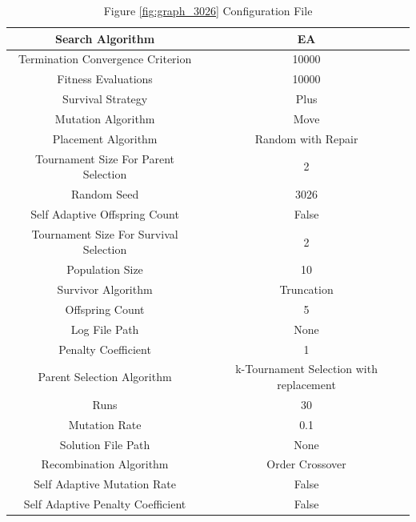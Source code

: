 \documentclass{standalone}
\begin{document}
\begin{table}[!htb]
	\centering
	\caption{Figure \ref{fig:graph_3026} Configuration File}
	\label{tab:graph_3026}
	\begin{tabular}{| c | c |}
		\hline
		Search Algorithm		& EA		 \\
		\hline
		Termination Convergence Criterion		& 10000		 \\
		\hline
		Fitness Evaluations		& 10000		 \\
		\hline
		Survival Strategy		& Plus		 \\
		\hline
		Mutation Algorithm		& Move		 \\
		\hline
		Placement Algorithm		& Random with Repair		 \\
		\hline
		Tournament Size For Parent Selection		& 2		 \\
		\hline
		Random Seed		& 3026		 \\
		\hline
		Self Adaptive Offspring Count		& False		 \\
		\hline
		Tournament Size For Survival Selection		& 2		 \\
		\hline
		Population Size		& 10		 \\
		\hline
		Survivor Algorithm		& Truncation		 \\
		\hline
		Offspring Count		& 5		 \\
		\hline
		Log File Path		& None		 \\
		\hline
		Penalty Coefficient		& 1		 \\
		\hline
		Parent Selection Algorithm		& k-Tournament Selection with replacement		 \\
		\hline
		Runs		& 30		 \\
		\hline
		Mutation Rate		& 0.1		 \\
		\hline
		Solution File Path		& None		 \\
		\hline
		Recombination Algorithm		& Order Crossover		 \\
		\hline
		Self Adaptive Mutation Rate		& False		 \\
		\hline
		Self Adaptive Penalty Coefficient		& False		 \\
		\hline
	\end{tabular}
\end{table}
\end{document}
